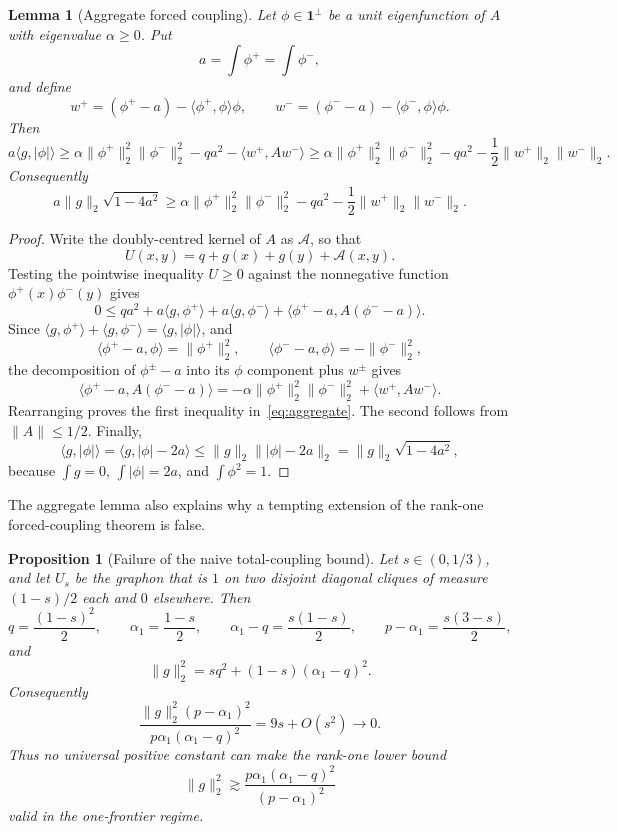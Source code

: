 \documentclass[11pt]{article}
\newtheorem{proposition}[theorem]{Proposition}
\newtheorem{lemma}[theorem]{Lemma}
\newcommand{\one}{\mathbf 1}
\newcommand{\ip}[2]{\langle #1,#2\rangle}
\newcommand{\norm}[1]{\lVert #1\rVert}
\begin{document}
\begin{lemma}[Aggregate forced coupling]\label{lem:aggregate}
Let $\phi\in\one^\perp$ be a unit eigenfunction of $A$ with eigenvalue $\alpha\ge0$.  Put
\[
        a=\int\phi^+=\int\phi^-,
\]
and define
\[
        w^+=(\phi^+-a)-\ip{\phi^+}{\phi}\phi,
        \qquad
        w^-=(\phi^--a)-\ip{\phi^-}{\phi}\phi.
\]
Then
\begin{equation}\label{eq:aggregate}
        a\ip{g}{|\phi|}
        \ge
        \alpha\norm{\phi^+}_2^2
        \norm{\phi^-}_2^2
        -qa^2-\ip{w^+}{Aw^-}
        \ge
        \alpha\norm{\phi^+}_2^2
        \norm{\phi^-}_2^2
        -qa^2-\frac12\norm{w^+}_2\norm{w^-}_2.
\end{equation}
Consequently
\begin{equation}\label{eq:aggregate-CS}
        a\norm g_2\sqrt{1-4a^2}
        \ge
        \alpha\norm{\phi^+}_2^2
        \norm{\phi^-}_2^2
        -qa^2-\frac12\norm{w^+}_2\norm{w^-}_2.
\end{equation}
\end{lemma}

\begin{proof}
Write the doubly-centred kernel of $A$ as $\mathcal A$, so that
\[
        U(x,y)=q+g(x)+g(y)+\mathcal A(x,y).
\]
Testing the pointwise inequality $U\ge0$ against the nonnegative function $\phi^+(x)\phi^-(y)$ gives
\[
        0\le q a^2+a\ip{g}{\phi^+}+a\ip{g}{\phi^-}
        +\ip{\phi^+-a}{A(\phi^--a)}.
\]
Since $\ip{g}{\phi^+}+\ip{g}{\phi^-}=\ip{g}{|\phi|}$, and
\[
        \ip{\phi^+-a}{\phi}=\norm{\phi^+}_2^2,
        \qquad
        \ip{\phi^--a}{\phi}=-\norm{\phi^-}_2^2,
\]
the decomposition of $\phi^\pm-a$ into its $\phi$ component plus $w^\pm$ gives
\[
        \ip{\phi^+-a}{A(\phi^--a)}
        =-\alpha\norm{\phi^+}_2^2\norm{\phi^-}_2^2+
        \ip{w^+}{Aw^-}.
\]
Rearranging proves the first inequality in~\eqref{eq:aggregate}.  The second follows from $\norm A\le1/2$.  Finally,
\[
        \ip{g}{|\phi|}=\ip{g}{|\phi|-2a}
        \le\norm g_2\norm{|\phi|-2a}_2
        =\norm g_2\sqrt{1-4a^2},
\]
because $\int g=0$, $\int |\phi|=2a$, and $\int\phi^2=1$.
\end{proof}

The aggregate lemma also explains why a tempting extension of the rank-one forced-coupling theorem is false.

\begin{proposition}[Failure of the naive total-coupling bound]\label{prop:two-clique}
Let $s\in(0,1/3)$, and let $U_s$ be the graphon that is $1$ on two disjoint diagonal cliques of measure $(1-s)/2$ each and $0$ elsewhere.  Then
\[
        q=\frac{(1-s)^2}{2},
        \qquad
        \alpha_1=\frac{1-s}{2},
        \qquad
        \alpha_1-q=\frac{s(1-s)}2,
        \qquad
        p-
        \alpha_1=\frac{s(3-s)}2,
\]
and
\[
        \norm g_2^2=sq^2+(1-s)(\alpha_1-q)^2.
\]
Consequently
\[
        \frac{\norm g_2^2(p-
        \alpha_1)^2}{p\alpha_1(\alpha_1-q)^2}
        =9s+O(s^2)\to0.
\]
Thus no universal positive constant can make the rank-one lower bound
\[
        \norm g_2^2\gtrsim \frac{p\alpha_1(\alpha_1-q)^2}{(p-
        \alpha_1)^2}
\]
valid in the one-frontier regime.
\end{proposition}
\end{document}
